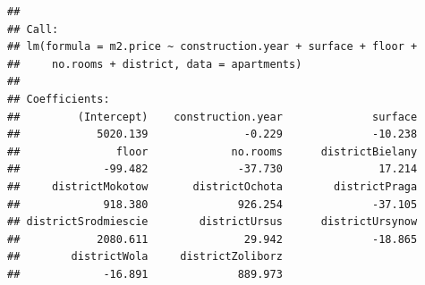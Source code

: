 \documentclass[]{book}
\theoremstyle{definition}
\theoremstyle{definition}
\theoremstyle{definition}
\theoremstyle{remark}
\begin{document}
\begin{verbatim}
## 
## Call:
## lm(formula = m2.price ~ construction.year + surface + floor + 
##     no.rooms + district, data = apartments)
## 
## Coefficients:
##         (Intercept)    construction.year              surface  
##            5020.139               -0.229              -10.238  
##               floor             no.rooms      districtBielany  
##             -99.482              -37.730               17.214  
##     districtMokotow       districtOchota        districtPraga  
##             918.380              926.254              -37.105  
## districtSrodmiescie        districtUrsus      districtUrsynow  
##            2080.611               29.942              -18.865  
##        districtWola     districtZoliborz  
##             -16.891              889.973
\end{verbatim}


\end{document}
